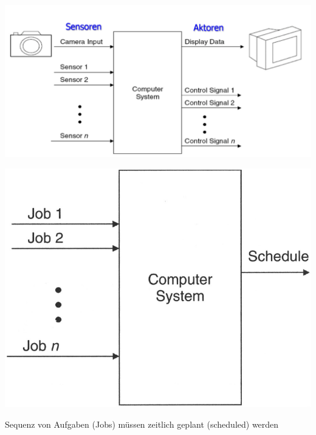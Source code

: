 \begin{minipage}[t]{0.55\columnwidth}
    \begin{center}

        \vspace{0.1cm}

        \includegraphics[width=\columnwidth]{images/typisches_echtzeitsystem.png}
    \end{center}
\end{minipage}
\hfill
\begin{minipage}[t]{0.4\columnwidth}
    \begin{center}

        \vspace{0.1cm}

        \includegraphics[width=0.7\columnwidth]{images/typische_repraesentation_echtzeitsystem.png}

        Sequenz von Aufgaben (Jobs) müssen zeitlich geplant (scheduled) werden
    \end{center}
\end{minipage}



